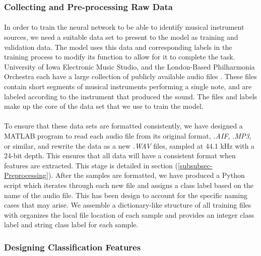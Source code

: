 \documentclass[12pt,letterpaper]{article}
\begin{document}

\subsubsection{Collecting and Pre-processing Raw Data}

\paragraph*{}In order to train the neural network to be able to identify musical instrument sources, we need a suitable data set to present to the model as training and validation data. The model uses this data and corresponding labels in the training process to modify its function to allow for it to complete the task. University of Iowa Electronic Music Studio, and the London-Based Philharmonia Orchestra each have a large collection of publicly available audio files \cite{UnivIowa,Philharmonia}. These files contain short segments of musical instruments performing a single note, and are labeled according to the instrument that produced the sound. The files and labels make up the core of the data set that we use to train the model.

\paragraph*{}To ensure that these data sets are formatted consistently, we have designed a MATLAB program to read each audio file from its original format, \textit{.AIF}, \textit{.MP3}, or similar, and rewrite the data as a new \textit{.WAV} files, sampled at 44.1 kHz with a 24-bit depth. This ensures that all data will have a consistent format when features are extracted. This stage is detailed in section (\ref{subsubsec-Preprocessing}). After the samples are formatted, we have produced a Python script which iterates through each new file and assigns a class label based on the name of the audio file. This has been design to account for the specific naming cases that may arise. We assemble a dictionary-like structure of all training files with organizes the local file location of each sample and provides an integer class label and string class label for each sample. 


\subsubsection{Designing Classification Features}
\end{document}
